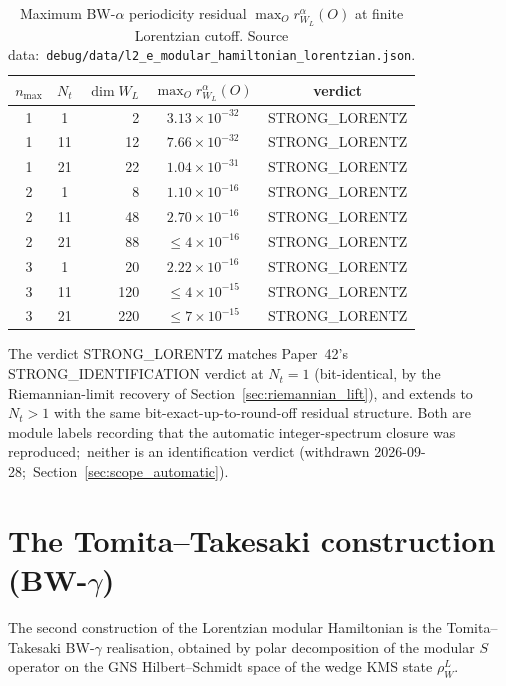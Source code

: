 \documentclass[11pt,a4paper]{article}
\theoremstyle{plain}
\theoremstyle{definition}
\newcommand{\nmax}{n_{\max}}
\newcommand{\Nt}{N_t}
\begin{document}
\begin{table}[ht]
\centering
\caption{Maximum BW-$\alpha$ periodicity residual
$\max_O r_{W_L}^\alpha(O)$ at finite Lorentzian cutoff. Source data:\
\texttt{debug/data/l2\_e\_modular\_hamiltonian\_lorentzian.json}.}
\label{tab:bw_alpha_lorentz_residuals}
\begin{tabular}{ccrcc}
\toprule
$\nmax$ & $\Nt$ & $\dim W_L$ &
$\max_O r_{W_L}^\alpha(O)$ & verdict\\
\midrule
1 & 1  & 2   & $3.13 \times 10^{-32}$ & STRONG\_LORENTZ \\
1 & 11 & 12  & $7.66 \times 10^{-32}$ & STRONG\_LORENTZ \\
1 & 21 & 22  & $1.04 \times 10^{-31}$ & STRONG\_LORENTZ \\
2 & 1  & 8   & $1.10 \times 10^{-16}$ & STRONG\_LORENTZ \\
2 & 11 & 48  & $2.70 \times 10^{-16}$ & STRONG\_LORENTZ \\
2 & 21 & 88  & $\le 4 \times 10^{-16}$ & STRONG\_LORENTZ \\
3 & 1  & 20  & $2.22 \times 10^{-16}$ & STRONG\_LORENTZ \\
3 & 11 & 120 & $\le 4 \times 10^{-15}$ & STRONG\_LORENTZ \\
3 & 21 & 220 & $\le 7 \times 10^{-15}$ & STRONG\_LORENTZ \\
\bottomrule
\end{tabular}
\end{table}

The verdict STRONG\_LORENTZ matches Paper~42's STRONG\_IDENTIFICATION
verdict at $\Nt = 1$ (bit-identical, by the Riemannian-limit recovery
of Section~\ref{sec:riemannian_lift}), and extends to $\Nt > 1$ with
the same bit-exact-up-to-round-off residual structure.  Both are
module labels recording that the automatic integer-spectrum closure
was reproduced;\ neither is an identification verdict (withdrawn
2026-09-28;\ Section~\ref{sec:scope_automatic}).

\section{The Tomita--Takesaki construction (BW-$\gamma$)}\label{sec:bw_gamma}

The second construction of the Lorentzian modular Hamiltonian is the
Tomita--Takesaki BW-$\gamma$ realisation, obtained by polar
decomposition of the modular $S$ operator on the GNS Hilbert--Schmidt
space of the wedge KMS state $\rho_W^L$.
\end{document}
